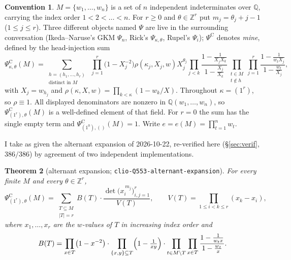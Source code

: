 \documentclass[11pt]{article}
\newtheorem{theorem}{Theorem}
\theoremstyle{definition}
\newtheorem{convention}[theorem]{Convention}
\newcommand{\PsiC}{\Psi^{\mathrm{C}}}
\begin{document}
\begin{convention}\label{conv:psi}
$M=\{w_1,\dots,w_n\}$ is a set of $n$ independent indeterminates over $\mathbb{Q}$,
carrying the index order $1<2<\dots<n$. For $r\ge0$ and $\theta\in\mathbb{Z}^r$ put
$m_j=\theta_j+j-1$ ($1\le j\le r$). Three different objects named $\Psi$ are live in the
surrounding conversation (Ikeda--Naruse's GKM $\Psi_n$, Rick's $\Psi_{\kappa,\theta}$,
Rupel's $\Psi_i$); $\PsiC$ denotes \emph{mine}, defined by the head-injection sum
\begin{equation}\label{eq:Psidef}
  \PsiC_{\kappa,\theta}(M)
  =\sum_{\substack{h=(h_1,\dots,h_r)\\ \text{distinct in }M}}
   \;\prod_{j=1}^{r}\bigl(1-X_j^{-2}\bigr)\rho(\kappa_j,X_j,w)X_j^{\theta_j}
   \prod_{j<k}\frac{1-\frac{1}{X_jX_k}}{1-\frac{X_j}{X_k}}
   \prod_{\substack{t\in M\\ t\notin h}}\prod_{j=1}^{r}\frac{1-\frac{1}{w_tX_j}}{1-\frac{w_t}{X_j}},
\end{equation}
with $X_j=w_{h_j}$ and $\rho(\kappa,X,w)=\prod_{k<\kappa}(1-w_k/X)$. Throughout
$\kappa=(1^r)$, so $\rho\equiv1$. All displayed denominators are nonzero in
$\mathbb{Q}(w_1,\dots,w_n)$, so $\PsiC_{(1^r),\theta}(M)$ is a well-defined element of that
field. For $r=0$ the sum has the single empty term and $\PsiC_{(1^0),()}(M)=1$. Write
$e=e(M)=\prod_{t=1}^{n}w_t$.
\end{convention}

I take as given the alternant expansion of 2026-10-22, re-verified here
(\S\ref{sec:verif}, $386/386$) by agreement of two independent implementations.

\begin{theorem}[alternant expansion; \texttt{clio-Q553-alternant-expansion}]\label{thm:alt}
For every finite $M$ and every $\theta\in\mathbb{Z}^r$,
\[
  \PsiC_{(1^r),\theta}(M)
  =\sum_{\substack{T\subseteq M\\ |T|=r}} B(T)\cdot
    \frac{\det\bigl(x_i^{\,m_j}\bigr)_{i,j=1}^{r}}{V(T)},
  \qquad V(T)=\prod_{1\le i<k\le r}(x_k-x_i),
\]
where $x_1,\dots,x_r$ are the $w$-values of $T$ in increasing index order and
\begin{equation}\label{eq:B}
  B(T)=\prod_{x\in T}\bigl(1-x^{-2}\bigr)\cdot
       \prod_{\{x,y\}\subseteq T}\Bigl(1-\tfrac{1}{xy}\Bigr)\cdot
       \prod_{t\in M\setminus T}\prod_{x\in T}\frac{1-\frac{1}{w_tx}}{1-\frac{w_t}{x}} .
\end{equation}
\end{theorem}
\end{document}
